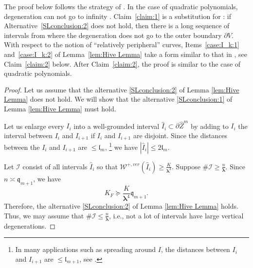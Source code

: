 \documentclass{amsart}
\newcommand{\1}{{\mathbb 1 }}
\newcommand{\blambda}{{\boldsymbol\lambda}}
\newcommand{\Width}{{\mathcal W}}
\newcommand{\wI}{{\widehat I}}
\newcommand{\wZ}{{\widehat Z}}
\newcommand{\qq}{\mathfrak{q}}
\newcommand{\length}{{\mathfrak l}}
\theoremstyle{remark}
\numberwithin{equation}{section}
\theoremstyle{definition}
\begin{document}
\noindent The proof below follows the strategy of \cite[Lemma 8.6]{DL22}. In the case of quadratic polynomials, degeneration can not go to infinity \cite[Lemma~6.14]{DL22}. Claim~\ref {claim:1} is a substitution for \cite[Lemma~6.14]{DL22}: if Alternative~\ref{SLconclusion:2} does not hold, then there is a long sequence of intervals from where the degeneration does not go to the outer boundary $\partial V$.  With respect to the notion of ``relatively peripheral'' curves, Items~\ref{case:I_k:1} and~\ref{case:I_k:2} of Lemma~\ref{lem:Hive Lemma} take a form similar to that in \cite[Lemma 8.6]{DL22}, see Claim~\ref{claim:2} below. After Claim~\ref{claim:2}, the proof is similar to the case of quadratic polynomials.

\begin{proof}
    Let us assume that the alternative \ref{SLconclusion:2} of Lemma \ref{lem:Hive Lemma} does not hold. We will show that the alternative \ref{SLconclusion:1} of Lemma \ref{lem:Hive Lemma} must hold.

    Let us enlarge every $I_i$ into a well-grounded interval $\wI_i\subset \partial \wZ^m$ by adding to $I_i$ the interval between $I_i$ and $I_{i+1}$ if $I_i$ and $I_{i+1}$ are disjoint. Since the distances between the $I_i$ and $I_{i+1}$ are $\le \length_{m}$, \footnote{In many applications such as spreading around $I$, the distances between $I_i$ and $I_{i+1}$ are $\le \length_{m+1}$, see \cite[\S 2.1.4]{DL22}.} we have $|\wI_i|\le 2 \length_m$.
    

    Let $\mathcal{I}$ consist of all intervals $\wI_i$ so that $\Width^{+, ver}(\wI_i) \geq \frac{K}{\blambda^3}$.
    Suppose $\#\mathcal{I} \geq \frac{n}{\blambda}$. Since $n \asymp \qq_{m+1}$, we have 
    $$
    K_F \succeq \frac{K}{\blambda^4} \qq_{m+1}.
    $$
    Therefore, the alternative \ref{SLconclusion:2} of Lemma \ref{lem:Hive Lemma} holds.
    Thus, we may assume that $\#\mathcal{I} \leq \frac{n}{\blambda}$, i.e., not a lot of intervals have large vertical degenerations.


\end{proof}
\end{document}
